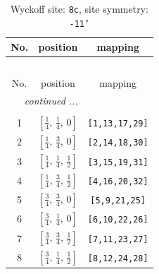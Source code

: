 \documentclass[fleqn,8pt]{jsarticle}
\begin{document}
\renewcommand{\arraystretch}{1.2}
\begin{longtable}{ccc}
\caption{Wyckoff site: {\tt 8c}, site symmetry: {\tt -11'}}
 \\
 \hline \hline
No. & position & mapping \\ \hline \endfirsthead

\multicolumn{2}{l}{\tablename\ \thetable{}} \\
 \hline \hline
No. & position & mapping \\ \hline \endhead

 \hline \hline
\multicolumn{2}{r}{\footnotesize\it continued ...} \\ \endfoot

 \hline \hline
\multicolumn{2}{r}{} \\ \endlastfoot

1 & $\left[ \frac{1}{4},\, \frac{1}{4},\, 0 \right]$ & {\tt [1,13,17,29]} \\ \hline
2 & $\left[ \frac{1}{4},\, \frac{3}{4},\, 0 \right]$ & {\tt [2,14,18,30]} \\ \hline
3 & $\left[ \frac{1}{4},\, \frac{1}{4},\, \frac{1}{2} \right]$ & {\tt [3,15,19,31]} \\ \hline
4 & $\left[ \frac{1}{4},\, \frac{3}{4},\, \frac{1}{2} \right]$ & {\tt [4,16,20,32]} \\ \hline
5 & $\left[ \frac{3}{4},\, \frac{3}{4},\, 0 \right]$ & {\tt [5,9,21,25]} \\ \hline
6 & $\left[ \frac{3}{4},\, \frac{1}{4},\, 0 \right]$ & {\tt [6,10,22,26]} \\ \hline
7 & $\left[ \frac{3}{4},\, \frac{3}{4},\, \frac{1}{2} \right]$ & {\tt [7,11,23,27]} \\ \hline
8 & $\left[ \frac{3}{4},\, \frac{1}{4},\, \frac{1}{2} \right]$ & {\tt [8,12,24,28]} \\
\end{longtable}
\renewcommand{\arraystretch}{1.2}
\end{document}
